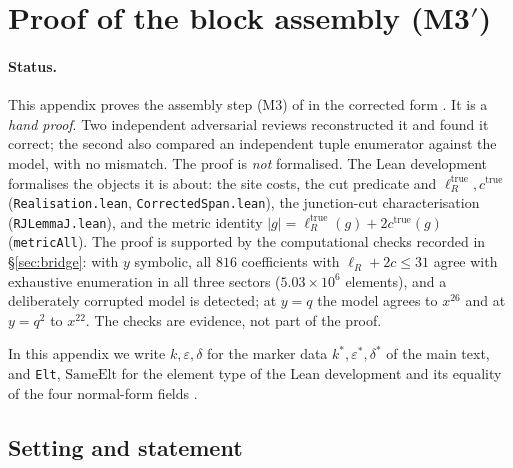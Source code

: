 \documentclass[11pt]{article}
\theoremstyle{plain}
\theoremstyle{definition}
\theoremstyle{remark}
\begin{document}
\section{Proof of the block assembly \textup{(M3$'$)}}\label{app:M3prime}

\paragraph{Status.}
This appendix proves the assembly step \textup{(M3)} of {\cite[Theorem ``the transfer model \textup{(M)}'', \textup{thm:model}]{Bonfioli2026bA}} in the corrected form
{\cite[\textup{(eq:assembly)}]{Bonfioli2026bA}}. It is a \emph{hand proof}. Two independent adversarial reviews reconstructed it
and found it correct; the second also compared an independent tuple enumerator against the
model, with no mismatch. The proof is \emph{not} formalised. The Lean development formalises the
objects it is about: the site costs, the cut predicate and
$\ell_R^{\mathrm{true}},c^{\mathrm{true}}$ (\texttt{Realisation.lean},
\texttt{CorrectedSpan.lean}), the junction-cut characterisation (\texttt{RJLemmaJ.lean}), and
the metric identity $|g|=\ell_R^{\mathrm{true}}(g)+2c^{\mathrm{true}}(g)$
(\texttt{metricAll}). The proof is supported by the computational checks recorded in
\S\ref{sec:bridge}: with $y$ symbolic, all $816$ coefficients with $\ell_R+2c\le31$ agree with
exhaustive enumeration in all three sectors ($5.03\times10^6$ elements), and a deliberately
corrupted model is detected; at $y=q$ the model agrees to $x^{26}$ and at $y=q^2$ to $x^{22}$. The
checks are evidence, not part of the proof.

In this appendix we write $k,\varepsilon,\delta$ for the marker data $k^\ast,\varepsilon^\ast,\delta^\ast$
of the main text, and \texttt{Elt}, $\mathrm{SameElt}$ for the element type of the Lean development
and its equality of the four normal-form fields
\cite[Theorem ``Normal form and lamp model'', \textup{thm:normal-form}]{Bonfioli2026a}.

\subsection{Setting and statement}
\end{document}
